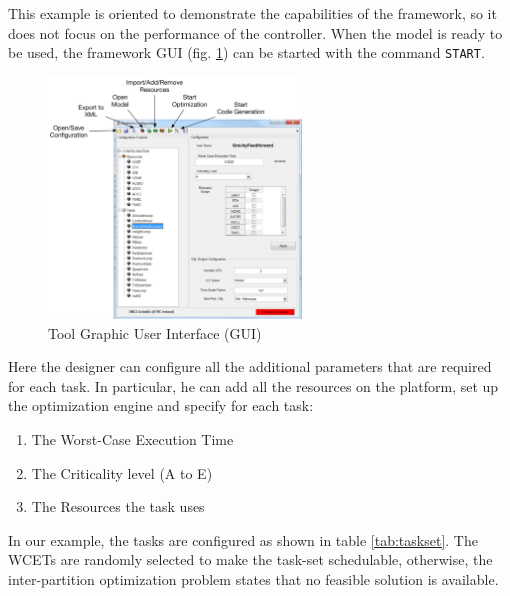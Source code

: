 This example is oriented to demonstrate the capabilities of the framework, so it does not focus on the performance of the controller. When the model is ready to be used, the framework GUI (fig. \ref{fig:GUI}) can be started with the command \verb|START|. 
\begin{figure}[htbp] 
\centering    
\includegraphics[width=0.6\textwidth]{PlatformConfiguration}
\caption{Tool Graphic User Interface (GUI)}
\label{fig:GUI}
\end{figure}
Here the designer can configure all the additional parameters that are required for each task. In particular, he can add all the resources on the platform, set up the optimization engine and specify for each task:
\begin{enumerate}
\item The Worst-Case Execution Time
\item The Criticality level (A to E)
\item The Resources the task uses
\end{enumerate}
In our example, the tasks are configured as shown in table \ref{tab:taskset}. The WCETs are randomly selected to make the task-set schedulable, otherwise, the inter-partition optimization problem states that no feasible solution is available.
